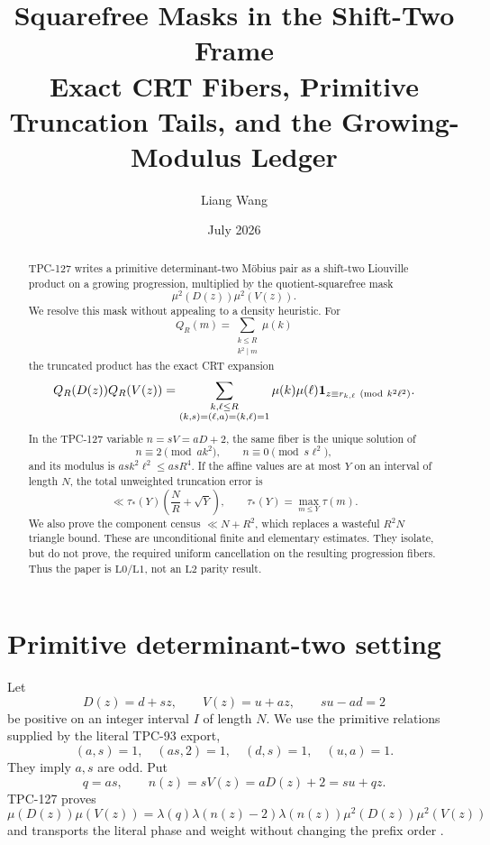 \documentclass[11pt]{article}
\title{\textbf{Squarefree Masks in the Shift-Two Frame}\\
\large Exact CRT Fibers, Primitive Truncation Tails, and the
Growing-Modulus Ledger}
\author{Liang Wang}
\date{July 2026}
\theoremstyle{definition}
\theoremstyle{remark}
\newcommand{\one}{\mathbf 1}
\newcommand{\Lzero}{\mathrm{L0}}
\newcommand{\Lone}{\mathrm{L1}}
\newcommand{\Ltwo}{\mathrm{L2}}
\begin{document}
\maketitle

\begin{abstract}
TPC-127 writes a primitive determinant-two M\"obius pair as a
shift-two Liouville product on a growing progression, multiplied by
the quotient-squarefree mask
\[
 \mu^2(D(z))\mu^2(V(z)).
\]
We resolve this mask without appealing to a density heuristic.  For
\[
 Q_R(m)=\sum_{\substack{k\le R\\k^2\mid m}}\mu(k)
\]
the truncated product has the exact CRT expansion
\[
 Q_R(D(z))Q_R(V(z))
 =
 \sum_{\substack{k,\ell\le R\\
 (k,s)=(\ell,a)=(k,\ell)=1}}
 \mu(k)\mu(\ell)
 \one_{z\equiv r_{k,\ell}\ ({\rm mod}\ k^2\ell^2)}.
\]
In the TPC-127 variable \(n=sV=aD+2\), the same fiber is the unique
solution of
\[
 n\equiv2\pmod{ak^2},\qquad n\equiv0\pmod{s\ell^2},
\]
and its modulus is \(ask^2\ell^2\le asR^4\).  If the affine values
are at most \(Y\) on an interval of length \(N\), the total
unweighted truncation error is
\[
 \ll \tau_*(Y)\left(\frac NR+\sqrt Y\right),
\qquad
 \tau_*(Y)=\max_{m\le Y}\tau(m).
\]
We also prove the component census
\(\ll N+R^2\), which replaces a wasteful \(R^2N\) triangle bound.
These are unconditional finite and elementary estimates.  They
isolate, but do not prove, the required uniform cancellation on the
resulting progression fibers.  Thus the paper is \(\Lzero/\Lone\),
not an \(\Ltwo\) parity result.
\end{abstract}

\section{Primitive determinant-two setting}

Let
\begin{equation}
 D(z)=d+sz,\qquad V(z)=u+az,\qquad su-ad=2
\label{eq:forms}
\end{equation}
be positive on an integer interval \(I\) of length \(N\).  We use
the primitive relations supplied by the literal TPC-93 export,
\begin{equation}
 (a,s)=1,\quad (as,2)=1,\quad (d,s)=1,\quad (u,a)=1.
\label{eq:primitive}
\end{equation}
They imply \(a,s\) are odd.  Put
\[
 q=as,\qquad n(z)=sV(z)=aD(z)+2=su+qz.
\]
TPC-127 proves
\[
 \mu(D(z))\mu(V(z))
 =
 \lambda(q)\lambda(n(z)-2)\lambda(n(z))
 \mu^2(D(z))\mu^2(V(z))
\]
and transports the literal phase and weight without changing the
prefix order \citep{WangTPC127}.
\end{document}
